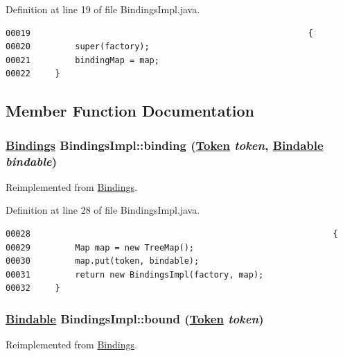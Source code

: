 Definition at line 19 of file Bindings\-Impl.java.\footnotesize\begin{verbatim}00019                                                        {
00020         super(factory);
00021         bindingMap = map;
00022     }
\end{verbatim}\normalsize 


\subsection{Member Function Documentation}
\hypertarget{classBindingsImpl_a1}{
\subsubsection[binding]{\setlength{\rightskip}{0pt plus 5cm}\hyperlink{interfaceBindings}{Bindings} Bindings\-Impl::binding (\hyperlink{interfaceToken}{Token} {\em token}, \hyperlink{interfaceBindable}{Bindable} {\em bindable})}}
\label{classBindingsImpl_a1}




Reimplemented from \hyperlink{interfaceBindings_a1}{Bindings}.

Definition at line 28 of file Bindings\-Impl.java.\footnotesize\begin{verbatim}00028                                                             {
00029         Map map = new TreeMap();
00030         map.put(token, bindable);
00031         return new BindingsImpl(factory, map);
00032     }
\end{verbatim}\normalsize 
\hypertarget{classBindingsImpl_a2}{
\subsubsection[bound]{\setlength{\rightskip}{0pt plus 5cm}\hyperlink{interfaceBindable}{Bindable} Bindings\-Impl::bound (\hyperlink{interfaceToken}{Token} {\em token})}}
\label{classBindingsImpl_a2}




Reimplemented from \hyperlink{interfaceBindings_a2}{Bindings}.

